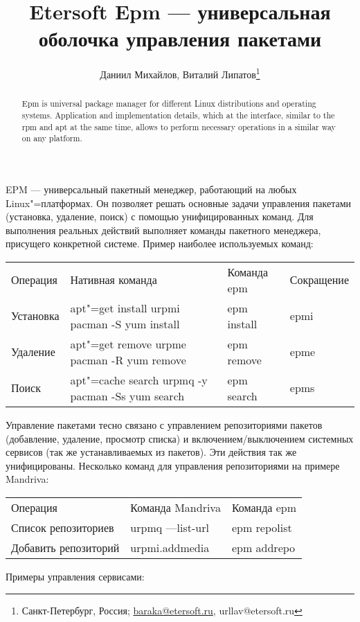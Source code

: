 \documentclass[10pt, a5paper]{article}
\begin{document}
\title{Etersoft Epm — универсальная оболочка управления пакетами}%

\author{Даниил Михайлов, Виталий Липатов\footnote{Санкт-Петербург, Россия; \url{baraka@etersoft.ru}, url{lav@etersoft.ru}}}
\maketitle

\begin{abstract}
Epm is universal package manager for different Linux distributions and operating systems. Application and implementation details, which at the interface, similar to the rpm and apt at the same time, allows to perform necessary operations in a similar way on any platform.
\end{abstract}

EPM — универсальный пакетный менеджер, работающий на любых Linux"=платформах. Он позволяет решать основные задачи управления пакетами (установка, удаление, поиск) с помощью унифицированных команд. Для выполнения реальных действий выполняет команды пакетного менеджера, присущего конкретной системе.
Пример наиболее используемых команд:

\begin{table}
  \centering
  \begin{tabular}{ l l l l }
    Операция & Нативная команда  & Команда epm & Сокращение \\
    Установка  & apt"=get install
urpmi
pacman -S
yum install & epm install & epmi \\
    Удаление  & apt"=get remove
urpme
pacman -R
yum remove & epm remove & epme \\
    Поиск  & apt"=cache search
urpmq -y
pacman -Ss
yum search & epm search & epms \\
  \end{tabular}
\end{table}
Управление пакетами тесно связано с управлением репозиториями пакетов (добавление, удаление, просмотр списка) и включением/выключением системных сервисов (так же устанавливаемых из пакетов). Эти действия так же унифицированы. Несколько команд для управления репозиториями на примере Mandriva:

\begin{table}
  \centering
  \begin{tabular}{ l l l }
    Операция & Команда Mandriva & Команда epm \\
    Список репозиториев & urpmq ---list-url & epm repolist \\
    Добавить репозиторий & urpmi.addmedia & epm addrepo \\
  \end{tabular}
\end{table}
Примеры управления сервисами:
\end{document}
